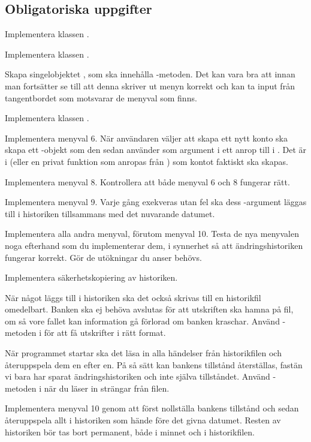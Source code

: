 \subsection{Obligatoriska uppgifter}

\Task Implementera klassen .

\Task Implementera klassen .

\Task Skapa singelobjektet , som ska innehålla -metoden. Det kan vara bra att innan man fortsätter se till att denna skriver ut menyn korrekt och kan ta input från tangentbordet som motsvarar de menyval som finns.

\Task Implementera klassen .

\Subtask Implementera menyval 6. När användaren väljer att skapa ett nytt konto ska  skapa ett -objekt som den sedan använder som argument i ett anrop till  i . Det är i  (eller en privat funktion som anropas från ) som kontot faktiskt ska skapas.

\Subtask Implementera menyval 8. Kontrollera att både menyval 6 och 8 fungerar rätt.

\Subtask Implementera menyval 9. Varje gång  exekveras utan fel ska dess -argument läggas till i historiken tillsammans med det nuvarande datumet.

\Subtask Implementera alla andra menyval, förutom menyval 10. Testa de nya menyvalen noga efterhand som du implementerar dem, i synnerhet så att ändringshistoriken fungerar korrekt. Gör de utökningar du anser behövs.

\Task Implementera säkerhetskopiering av historiken.

\Subtask När något läggs till i historiken ska det också skrivas till en historikfil omedelbart. Banken ska ej behöva avslutas för att utskriften ska hamna på fil, om så vore fallet kan information gå förlorad om banken kraschar. Använd -metoden i  för att få utskrifter i rätt format.

\Subtask När programmet startar ska det läsa in alla händelser från historikfilen och återuppspela dem en efter en. På så sätt kan bankens tillstånd återställas, fastän vi bara har sparat ändringshistoriken och inte själva tillståndet. Använd -metoden i  när du läser in strängar från filen.

\Task Implementera menyval 10 genom att först nollställa bankens tillstånd och sedan återuppspela allt i historiken som hände före det givna datumet. Resten av historiken bör tas bort permanent, både i minnet och i historikfilen.


